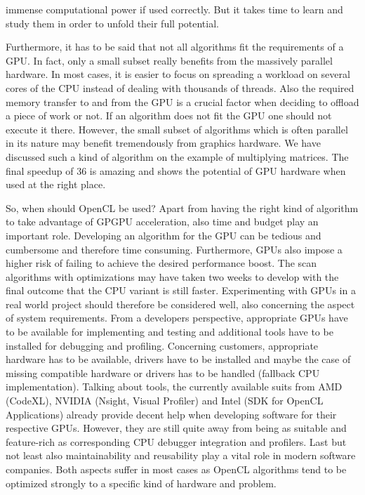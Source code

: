 immense computational power if used correctly. But it takes time to learn and study them in order to unfold their full potential.

Furthermore, it has to be said that not all algorithms fit the requirements of a GPU. In fact, only a small subset really benefits from the massively parallel hardware. In most cases, it is easier to focus on spreading a workload on several cores of the CPU instead of dealing with thousands of threads. Also the required memory transfer to and from the GPU is a crucial factor when deciding to offload a piece of work or not. If an algorithm does not fit the GPU one should not execute it there. However, the small subset of algorithms which is often parallel in its nature may benefit tremendously from graphics hardware. We have discussed such a kind of algorithm on the example of multiplying matrices. The final speedup of 36 is amazing and shows the potential of GPU hardware when used at the right place.

So, when should OpenCL be used? Apart from having the right kind of algorithm to take advantage of GPGPU acceleration, also time and budget play an important role. Developing an algorithm for the GPU can be tedious and cumbersome and therefore time consuming. Furthermore, GPUs also impose a higher risk of failing to achieve the desired performance boost. The scan algorithms with optimizations may have taken two weeks to develop with the final outcome that the CPU variant is still faster. Experimenting with GPUs in a real world project should therefore be considered well, also concerning the aspect of system requirements. From a developers perspective, appropriate GPUs have to be available for implementing and testing and additional tools have to be installed for debugging and profiling. Concerning customers, appropriate hardware has to be available, drivers have to be installed and maybe the case of missing compatible hardware or drivers has to be handled (fallback CPU implementation). Talking about tools, the currently available suits from AMD (CodeXL), NVIDIA (Nsight, Visual Profiler) and Intel (SDK for OpenCL Applications) already provide decent help when developing software for their respective GPUs. However, they are still quite away from being as suitable and feature-rich as corresponding CPU debugger integration and profilers. Last but not least also maintainability and reusability play a vital role in modern software companies. Both aspects suffer in most cases as OpenCL algorithms tend to be optimized strongly to a specific kind of hardware and problem.

